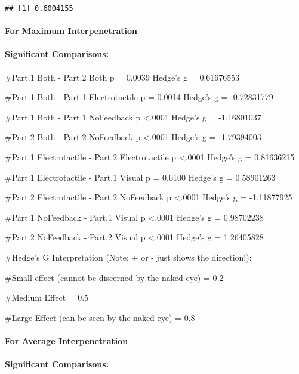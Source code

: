 \documentclass[
]{article}
\begin{document}
\begin{verbatim}
## [1] 0.6004155
\end{verbatim}

\hypertarget{for-maximum-interpenetration}{%
\paragraph{For Maximum
Interpenetration}\label{for-maximum-interpenetration}}

\hypertarget{significant-comparisons}{%
\paragraph{Significant Comparisons:}\label{significant-comparisons}}

\#Part.1 Both - Part.2 Both p = 0.0039 Hedge's g = 0.61676553

\#Part.1 Both - Part.1 Electrotactile p = 0.0014 Hedge's g = -0.72831779

\#Part.1 Both - Part.1 NoFeedback p \textless.0001 Hedge's g =
-1.16801037

\#Part.2 Both - Part.2 NoFeedback p \textless.0001 Hedge's g =
-1.79394003

\#Part.1 Electrotactile - Part.2 Electrotactile p \textless.0001 Hedge's
g = 0.81636215

\#Part.1 Electrotactile - Part.1 Visual p = 0.0100 Hedge's g =
0.58901263

\#Part.2 Electrotactile - Part.2 NoFeedback p \textless.0001 Hedge's g =
-1.11877925

\#Part.1 NoFeedback - Part.1 Visual p \textless.0001 Hedge's g =
0.98702238

\#Part.2 NoFeedback - Part.2 Visual p \textless.0001 Hedge's g =
1.26405828

\#Hedge's G Interpretation (Note: + or - just shows the direction!):

\#Small effect (cannot be discerned by the naked eye) = 0.2

\#Medium Effect = 0.5

\#Large Effect (can be seen by the naked eye) = 0.8

\hypertarget{for-average-interpenetration}{%
\paragraph{For Average
Interpenetration}\label{for-average-interpenetration}}

\hypertarget{significant-comparisons-1}{%
\paragraph{Significant Comparisons:}\label{significant-comparisons-1}}
\end{document}
